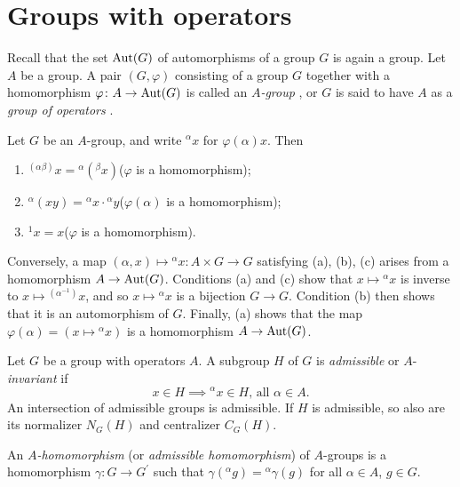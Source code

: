 \documentclass[a4paper,11pt,final,openany]{memoir}%
\theoremstyle{nonumberplain}
\begin{document}
\section{Groups with operators}

Recall that the set $\operatorname{Aut}(G)$ of automorphisms of a group $G$ is again a
group. Let $A$ be a group. A pair $(G,\varphi)$ consisting of a group $G$
together with a homomorphism $\varphi\colon A\rightarrow\operatorname{Aut}(G)$ is called an
$A$\emph{-group}%
%
, or $G$ is said to have $A$ as a \emph{group of operators}%
%
.

Let $G$ be an $A$-group, and write $^{\alpha}x$ for $\varphi(\alpha)x$. Then

\begin{enumerate}
\item $^{(\alpha\beta)}x={}^{\alpha}({}^{\beta}x)$\qquad($\varphi$ is a homomorphism);

\item $^{\alpha}(xy)={}^{\alpha}x\cdot{}^{\alpha}y$\qquad($\varphi(\alpha)$ is
a homomorphism);{}

\item $^{1}x=x$\qquad\qquad($\varphi$ is a homomorphism).
\end{enumerate}

\noindent Conversely, a map $(\alpha,x)\mapsto{}^{\alpha}x:A\times
G\rightarrow G$ satisfying (a), (b), (c) arises from a homomorphism
$A\rightarrow\operatorname{Aut}(G)$. Conditions (a) and (c) show that $x\mapsto{}^{\alpha}x$
is inverse to $x\mapsto{}^{(\alpha^{-1})}x$, and so $x\mapsto{}^{\alpha}x$ is
a bijection $G\rightarrow G$. Condition (b) then shows that it is an
automorphism of $G$. Finally, (a) shows that the map $\varphi(\alpha
)=(x\mapsto{}^{\alpha}x)$ is a homomorphism $A\rightarrow\operatorname{Aut}(G)$.

Let $G$ be a group with operators $A$. A subgroup $H$ of $G$ is
\emph{admissible}%
%
\emph{\/} or $A$-\emph{invariant\/}%
if
\[
x\in H\implies{}^{\alpha}x\in H\text{, all }\alpha\in A.
\]
An intersection of admissible groups is admissible. If $H$ is admissible, so
also are its normalizer $N_{G}(H)$ and centralizer $C_{G}(H).$

An $A$\emph{-homomorphism\/} (or \emph{admissible homomorphism\/})%
of $A$-groups is a homomorphism $\gamma\colon G\rightarrow G^{\prime}$ such
that $\gamma({}^{\alpha}g)={}^{\alpha}\gamma(g)$ for all $\alpha\in A$, $g\in
G.$
\end{document}
